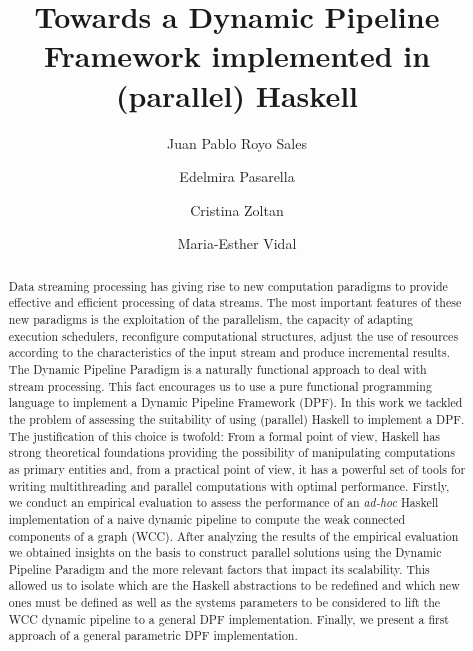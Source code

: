 \documentclass[preprint]{elsarticle}
\title{Towards a Dynamic Pipeline Framework implemented in (parallel) Haskell\tnoteref{t1}}
\author[1]{Juan Pablo Royo Sales}
\author[1]{Edelmira Pasarella}
\author[1]{Cristina Zoltan}
\author[2]{Maria-Esther Vidal}
\affiliation[1]{organization={Universitat Politecnica de Catalunya},
postcode={08034},
city={Barcelona},
country={Spain}}
\affiliation[2]{organization={TIB/L3S Research Centre at the University of Hannover},
city={Hannover},
country={Germany}}
\begin{document}
\begin{abstract}
Data streaming processing has giving rise to new computation paradigms to provide effective and efficient processing of data streams. The most important features of these new paradigms is the exploitation of  the parallelism, the capacity of adapting execution schedulers, reconfigure computational structures, adjust the use of resources according to the characteristics of the input stream and produce incremental results. The Dynamic Pipeline Paradigm is a naturally functional approach to deal with stream processing. This fact encourages us to use a  pure functional programming language to implement a Dynamic Pipeline Framework (DPF).  In this work we tackled the problem of assessing the suitability of using (parallel) Haskell to implement a DPF.  The justification of this choice is twofold: From a formal point of view, Haskell has strong theoretical foundations providing the possibility of manipulating computations as primary entities and, from a practical point of view,  it has a powerful set of tools for writing multithreading and parallel computations with optimal performance. Firstly, we conduct an empirical evaluation to assess the performance of an \textit{ad-hoc} Haskell implementation of a naive dynamic pipeline to compute  the weak connected components of a graph (WCC).  After analyzing the results of the empirical evaluation we obtained insights on  the basis to construct parallel solutions using the Dynamic Pipeline Paradigm and the more relevant  factors that impact its scalability.  This allowed us to isolate which are the Haskell abstractions to be redefined and which new ones must be defined as well as the systems parameters to be considered to lift the WCC dynamic pipeline to a general  DPF implementation. Finally, we present a first approach of a general parametric DPF implementation.

\end{abstract}
\end{document}

